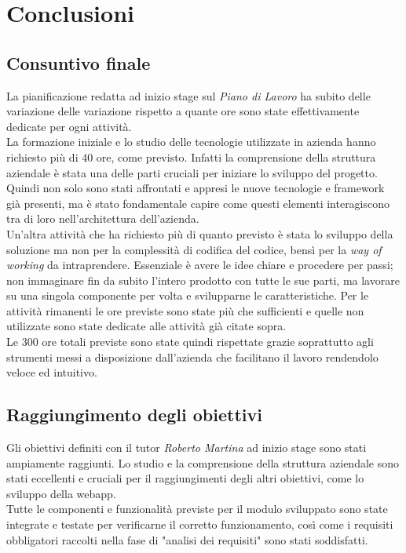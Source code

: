 \chapter{Conclusioni}
\label{cap:conclusioni}

\section{Consuntivo finale}
La pianificazione redatta ad inizio stage sul \textit{Piano di Lavoro} ha subito delle variazione delle variazione rispetto a quante ore sono state effettivamente dedicate per ogni attività.\\ La formazione iniziale e lo studio delle tecnologie utilizzate in azienda hanno richiesto più di 40 ore, come previsto. Infatti la comprensione della struttura aziendale è stata una delle parti cruciali per iniziare lo sviluppo del progetto. Quindi non solo sono stati affrontati e appresi le nuove tecnologie e framework già presenti, ma è stato fondamentale capire come questi elementi interagiscono tra di loro nell'architettura dell'azienda. \\
Un'altra attività che ha richiesto più di quanto previsto è stata lo sviluppo della soluzione ma non per la complessità di codifica del codice, bensì per la \textit{way of working} da intraprendere. Essenziale è avere le idee chiare e procedere per passi; non immaginare fin da subito l'intero prodotto con tutte le sue parti, ma lavorare su una singola componente per volta e svilupparne le caratteristiche. 
Per le attività rimanenti le ore previste sono state più che sufficienti e quelle non utilizzate sono state dedicate alle attività già citate sopra. \\
Le 300 ore totali previste sono state quindi rispettate grazie soprattutto agli strumenti messi a disposizione dall'azienda che facilitano il lavoro rendendolo veloce ed intuitivo.

\section{Raggiungimento degli obiettivi}
Gli obiettivi definiti con il tutor \textit{Roberto Martina} ad inizio stage sono stati ampiamente raggiunti. Lo studio e la comprensione della struttura aziendale sono stati eccellenti e cruciali per il raggiungimenti degli altri obiettivi, come lo sviluppo della webapp. \\
Tutte le componenti e funzionalità previste per il modulo sviluppato sono state integrate e testate per verificarne il corretto funzionamento, così come i requisiti obbligatori raccolti nella fase di "analisi dei requisiti" sono stati soddisfatti. 
